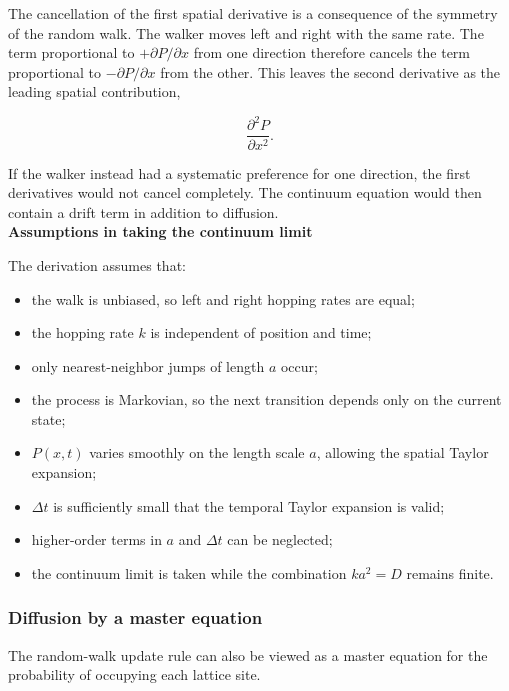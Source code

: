 The cancellation of the first spatial derivative is a consequence of the symmetry of the random walk.
The walker moves left and right with the same rate.
The term proportional to $+\partial P/\partial x$ from one direction therefore cancels the term proportional to $-\partial P/\partial x$ from the other.
This leaves the second derivative as the leading spatial contribution,

\[ 
    \frac{\partial^2P}{\partial x^2}. 
\]

If the walker instead had a systematic preference for one direction, the first derivatives would not cancel completely.
The continuum equation would then contain a drift term in addition to diffusion.
% 
% 
\medskip
\\
\textbf{Assumptions in taking the continuum limit}

The derivation assumes that:
\begin{itemize}
    \item the walk is unbiased, so left and right hopping rates are equal;
    \item the hopping rate $k$ is independent of position and time;
    \item only nearest-neighbor jumps of length $a$ occur;
    \item the process is Markovian, so the next transition depends only on the current state;
    \item $P(x,t)$ varies smoothly on the length scale $a$, allowing the spatial Taylor expansion;
    \item $\Delta t$ is sufficiently small that the temporal Taylor expansion is valid;
    \item higher-order terms in $a$ and $\Delta t$ can be neglected;
    \item the continuum limit is taken while the combination $ka^2=D$ remains finite.
\end{itemize}


\subsubsection{Diffusion by a master equation}

The random-walk update rule can also be viewed as a master equation for the probability of occupying each lattice site.


